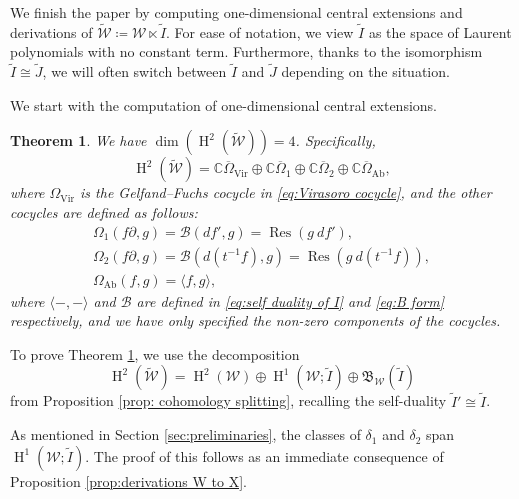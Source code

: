 \documentclass[11pt, svgnames]{amsart}
\DeclareMathOperator{\Vir}{Vir}
\DeclareMathOperator{\Res}{Res}
\newcommand{\B}{\mathfrak{B}}
\newcommand{\CC}{\mathbb{C}}
\newcommand{\W}{\mathcal{W}}
\newcommand{\del}{\partial}
\DeclareMathOperator{\HH}{H}
\DeclareMathOperator{\Ab}{Ab}
\newcommand{\ang}[1]{\langle #1 \rangle}
\newtheorem{theorem}[proposition]{Theorem}
\theoremstyle{definition}
\begin{document}
We finish the paper by computing one-dimensional central extensions and derivations of $\widetilde{\W} \coloneqq \W \ltimes \widetilde{I}$. For ease of notation, we view $\widetilde{I}$ as the space of Laurent polynomials with no constant term. Furthermore, thanks to the isomorphism $\widetilde{I} \cong \widetilde{J}$, we will often switch between $\widetilde{I}$ and $\widetilde{J}$ depending on the situation.

We start with the computation of one-dimensional central extensions.

\begin{theorem}\label{thm:central extensions W tilde}
    We have $\dim(\HH^2(\widetilde{\W})) = 4$. Specifically,
    $$\HH^2(\widetilde{\W}) = \CC \overline{\Omega}_{\Vir} \oplus \CC \overline{\Omega}_1 \oplus \CC \overline{\Omega}_2 \oplus \CC \overline{\Omega}_{\Ab},$$
    where $\Omega_{\Vir}$ is the Gelfand--Fuchs cocycle in \eqref{eq:Virasoro cocycle}, and the other cocycles are defined as follows:
    $$\begin{gathered}
        \Omega_1(f\del,g) = \mathcal{B}(df',g) = \Res(g \ df'), \\
        \Omega_2(f\del,g) = \mathcal{B}(d(t^{-1}f),g) = \Res(g \ d(t^{-1}f)), \\
        \Omega_{\Ab}(f,g) = \ang{f,g},
    \end{gathered}$$
    where $\ang{-,-}$ and $\mathcal{B}$ are defined in \eqref{eq:self duality of I} and \eqref{eq:B form} respectively, and we have only specified the non-zero components of the cocycles.
\end{theorem}

To prove Theorem \ref{thm:central extensions W tilde}, we use the decomposition
$$\HH^2(\widetilde{\W}) = \HH^2(\W) \oplus \HH^1(\W;\widetilde{I}) \oplus \B_\W(\widetilde{I})$$
from Proposition \ref{prop: cohomology splitting}, recalling the self-duality $\widetilde{I}' \cong \widetilde{I}$.

As mentioned in Section \ref{sec:preliminaries}, the classes of $\delta_1$ and $\delta_2$ span $\HH^1(\W;\widetilde{I})$. The proof of this follows as an immediate consequence of Proposition \ref{prop:derivations W to X}.
\end{document}
